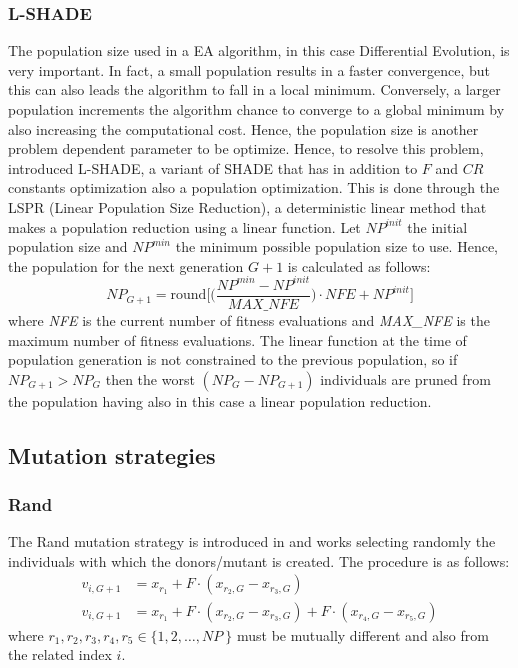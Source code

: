 \subsubsection{L-SHADE}
The population size used in a EA algorithm, in this case Differential Evolution, is very important. In fact, a small population results in a faster convergence, but this can also leads the algorithm to fall in a local minimum. Conversely, a larger population increments the algorithm chance to converge to a global minimum by also increasing the computational cost. Hence, the population size is another problem dependent parameter to be optimize.\newline\newline
Hence, to resolve this problem, \cite{LSHADE:2014} introduced L-SHADE, a variant of SHADE that has in addition to $F$ and $\textit{CR}$ constants optimization also a population optimization. This is done through the LSPR (Linear Population Size Reduction), a deterministic linear method that makes a population reduction using a linear function.\newline\newline
Let $\textit{NP}^{\textit{init}}$ the initial population size and $\textit{NP}^{\textit{min}}$ the minimum possible population size to use. Hence, the population for the next generation $G + 1$ is calculated as follows:
\begin{equation}
	\textit{NP}_{G + 1} = \textrm{round}\Bigg[\Bigg(\frac{\textit{NP}^{\textit{min}} - \textit{NP}^{\textit{init}}}{\textit{MAX\_NFE}} \Bigg) \cdot \textit{NFE} + \textit{NP}^{\textit{init}} \Bigg]
\end{equation}
where \textit{NFE} is the current number of fitness evaluations and \textit{MAX\_NFE} is the maximum number of fitness evaluations. The linear function at the time of population generation is not constrained to the previous population, so if $\textit{NP}_{G + 1} > \textit{NP}_{G}$ then the worst $(\textit{NP}_{G} - \textit{NP}_{G+1})$ individuals are pruned from the population having also in this case a linear population reduction.
\subsection{Mutation strategies}

\subsubsection{Rand}
The Rand mutation strategy is introduced in \cite{DESEHGOCS:1997} and works selecting randomly the individuals with which the donors/mutant is created. The procedure is as follows:
\begin{align}
	v_{i, G + 1} &= x_{r_{1}} + F \cdot (x_{r_2, G} - x_{r_3, G}) \\
	v_{i, G + 1} &= x_{r_{1}} + F \cdot (x_{r_2, G} - x_{r_3, G}) + F \cdot (x_{r_4, G} - x_{r_5, G})
\end{align}
where $r_1, r_2, r_3, r_4, r_5 \in \{1, 2, \dots, \textit{NP}\ \}$ must be mutually different and also from the related index $i$.


